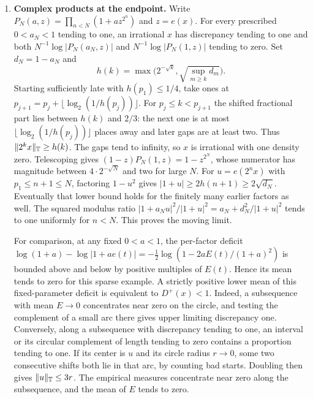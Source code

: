 \documentclass[11pt]{article}
\newcommand{\circabs}[1]{\lVert #1\rVert_{\T}}
\begin{document}
\begin{enumerate}[leftmargin=*,label=\textbf{\arabic*.}]
\item \textbf{Complex products at the endpoint.}
Write \(P_N(a,z)=\prod_{n<N}(1+az^{2^n})\) and \(z=e(x)\). For every prescribed \(0<a_N<1\) tending to one, an irrational \(x\) has discrepancy tending to one and both \(N^{-1}\log|P_N(a_N,z)|\) and \(N^{-1}\log|P_N(1,z)|\) tending to zero. Set \(d_N=1-a_N\) and
\[
 h(k)=\max\big(2^{-\sqrt{k}},\sqrt{\sup_{m\ge k}d_m}\big).
\]
Starting sufficiently late with \(h(p_1)\le1/4\), take ones at \(p_{j+1}=p_j+\lfloor\log_2(1/h(p_j))\rfloor\). For \(p_j\le k<p_{j+1}\) the shifted fractional part lies between \(h(k)\) and \(2/3\): the next one is at most \(\lfloor\log_2(1/h(p_j))\rfloor\) places away and later gaps are at least two. Thus \(\circabs{2^k x}\ge h(k)\). The gaps tend to infinity, so \(x\) is irrational with one density zero. Telescoping gives \((1-z)P_N(1,z)=1-z^{2^N}\), whose numerator has magnitude between \(4\cdot2^{-\sqrt N}\) and two for large \(N\). For \(u=e(2^n x)\) with \(p_1\le n+1\le N\), factoring \(1-u^2\) gives \(|1+u|\ge2h(n+1)\ge2\sqrt{d_N}\). Eventually that lower bound holds for the finitely many earlier factors as well. The squared modulus ratio \(|1+a_Nu|^2/|1+u|^2=a_N+d_N^2/|1+u|^2\) tends to one uniformly for \(n<N\). This proves the moving limit.

 For comparison, at any fixed \(0<a<1\), the per-factor deficit \(\log(1+a)-\log|1+ae(t)|=-\frac12\log(1-2a E(t)/(1+a)^2)\) is bounded above and below by positive multiples of \(E(t)\). Hence its mean tends to zero for this sparse example. A strictly positive lower mean of this fixed-parameter deficit is equivalent to \(D^+(x)<1\). Indeed, a subsequence with mean \(E\to0\) concentrates near zero on the circle, and testing the complement of a small arc there gives upper limiting discrepancy one. Conversely, along a subsequence with discrepancy tending to one, an interval or its circular complement of length tending to zero contains a proportion tending to one. If its center is \(u\) and its circle radius \(r\to0\), some two consecutive shifts both lie in that arc, by counting bad starts. Doubling then gives \(\circabs{u}\le3r\). The empirical measures concentrate near zero along the subsequence, and the mean of \(E\) tends to zero.


\end{enumerate}
\end{document}
